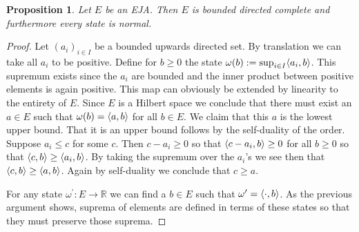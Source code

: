\documentclass[submission,copyright,creativecommons]{eptcs}
\newcounter{main}
\newtheorem{proposition}[main]{Proposition}
\theoremstyle{definition}
\DeclarePairedDelimiter{\inn}{\langle}{\rangle}
\newcommand\R{\mathbb{R}}
\begin{document}
\begin{proposition}\label{prop:dircomplete}
    Let $E$ be an EJA. Then $E$ is bounded directed complete and furthermore every state is normal.
\end{proposition}
\begin{proof}
    Let $(a_i)_{i\in I}$ be a bounded upwards directed set. By translation we can take all $a_i$ to be positive. Define for $b\geq 0$ the state $\omega(b):= \sup_{i\in I} \inn{a_i,b}$. This supremum exists since the $a_i$ are bounded and the inner product between positive elements is again positive. This map can obviously be extended by linearity to the entirety of $E$. Since $E$ is a Hilbert space we conclude that there must exist an $a\in E$ such that $\omega(b)=\inn{a,b}$ for all $b\in E$. We claim that this $a$ is the lowest upper bound. That it is an upper bound follows by the self-duality of the order. Suppose $a_i\leq c$ for some $c$. Then $c-a_i\geq 0$ so that $\inn{c-a_i,b}\geq 0$ for all $b\geq 0$ so that $\inn{c,b}\geq \inn{a_i,b}$. By taking the supremum over the $a_i$'s we see then that $\inn{c,b}\geq \inn{a,b}$. Again by self-duality we conclude that $c\geq a$.

    For any state $\omega^\prime: E\rightarrow \R$ we can find a $b\in E$ such that $\omega^\prime = \inn{\cdot, b}$. As the previous argument shows, suprema of elements are defined in terms of these states so that they must preserve those suprema.
\end{proof}
\end{document}
